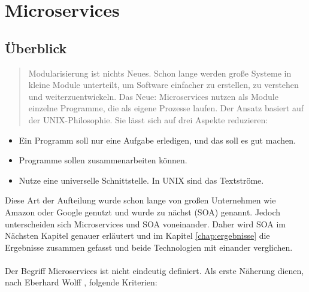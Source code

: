 \chapter{Microservices}
\label{chap:Microservices}

\section{Überblick}
\label{sec:überblickMicroservice}
\begin{quotation}
    \frqq Modularisierung ist nichts Neues. Schon lange werden große Systeme in kleine Module unterteilt, um Software einfacher zu erstellen, zu verstehen und weiterzuentwickeln. Das Neue: Microservices nutzen als Module einzelne Programme, die als eigene Prozesse laufen. Der Ansatz basiert auf der UNIX-Philosophie. Sie lässt sich auf drei Aspekte reduzieren:\flqq\cite[S. 2]{EWolff2016:Microservices}
\end{quotation}


\begin{itemize}
    \item Ein Programm soll nur eine Aufgabe erledigen, und das soll es gut machen.
    \item Programme sollen zusammenarbeiten können.
    \item Nutze eine universelle Schnittstelle. In UNIX sind das Textströme.
\end{itemize}
Diese Art der Aufteilung wurde schon lange von großen Unternehmen wie Amazon oder Google genutzt und wurde zu nächst \SOA (SOA) genannt. Jedoch unterscheiden sich Microservices und SOA voneinander. Daher wird SOA im Nächsten Kapitel genauer erläutert und im Kapitel \ref{chap:ergebnisse} die Ergebnisse zusammen gefasst und beide Technologien mit einander verglichen.
\\\\
Der Begriff Microservices ist nicht eindeutig definiert. Als erste Näherung dienen, nach Eberhard Wolff \cite[S. 2]{EWolff2016:Microservices}, folgende Kriterien:

